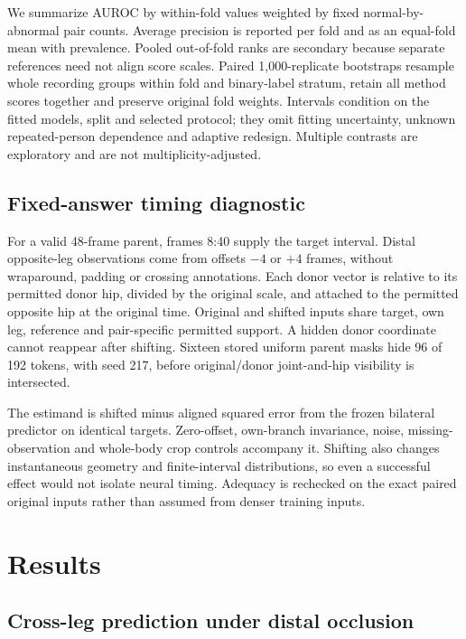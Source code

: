 \documentclass[letterpaper]{article}
\begin{document}
We summarize AUROC by within-fold values weighted by fixed normal-by-abnormal pair counts. Average precision is reported per fold and as an equal-fold mean with prevalence. Pooled out-of-fold ranks are secondary because separate references need not align score scales. Paired 1,000-replicate bootstraps resample whole recording groups within fold and binary-label stratum, retain all method scores together and preserve original fold weights. Intervals condition on the fitted models, split and selected protocol; they omit fitting uncertainty, unknown repeated-person dependence and adaptive redesign. Multiple contrasts are exploratory and are not multiplicity-adjusted.

\subsection{Fixed-answer timing diagnostic}

For a valid 48-frame parent, frames 8:40 supply the target interval. Distal opposite-leg observations come from offsets \(-4\) or \(+4\) frames, without wraparound, padding or crossing annotations. Each donor vector is relative to its permitted donor hip, divided by the original scale, and attached to the permitted opposite hip at the original time. Original and shifted inputs share target, own leg, reference and pair-specific permitted support. A hidden donor coordinate cannot reappear after shifting. Sixteen stored uniform parent masks hide 96 of 192 tokens, with seed 217, before original/donor joint-and-hip visibility is intersected.

The estimand is shifted minus aligned squared error from the frozen bilateral predictor on identical targets. Zero-offset, own-branch invariance, noise, missing-observation and whole-body crop controls accompany it. Shifting also changes instantaneous geometry and finite-interval distributions, so even a successful effect would not isolate neural timing. Adequacy is rechecked on the exact paired original inputs rather than assumed from denser training inputs.

\section{Results}

\subsection{Cross-leg prediction under distal occlusion}
\end{document}
